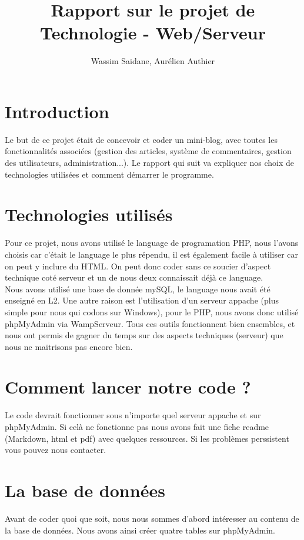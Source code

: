 \documentclass{article}
\title{Rapport sur le projet de Technologie - Web/Serveur}
\author{Wassim Saidane, Aurélien Authier}
\date{}
\begin{document}
    \maketitle
    \tableofcontents
    \newpage
    \section*{Introduction}
    Le but de ce projet était de concevoir et coder un mini-blog, avec toutes les fonctionnalités associées (gestion des articles, système de commentaires, gestion des utilisateurs, administration...). Le rapport qui suit va expliquer nos choix de technologies utilisées et comment démarrer le programme.   

    \section{Technologies utilisés}
    Pour ce projet, nous avons utilisé le language de programation PHP, 
    nous l'avons choisis car c'était le language le plus répendu,
    il est également facile à utiliser car on peut y inclure du HTML. On peut
    donc coder sans ce soucier d'aspect technique coté serveur et un de nous deux 
    connaissait déjà ce language. \\
    Nous avons utilisé une base de donnée mySQL, le language nous avait été enseigné en L2.
    Une autre raison est l'utilisation d'un serveur appache (plus simple pour nous qui codons sur Windows),
    pour le PHP, nous avons donc utilisé phpMyAdmin via WampServeur. Tous ces outils fonctionnent bien ensembles,
    et nous ont permis de gagner du temps sur des aspects techniques (serveur) que nous ne maitrisons pas encore bien.

    \section{Comment lancer notre code ?}
    Le code devrait fonctionner sous n'importe quel serveur appache et sur phpMyAdmin. Si celà ne fonctionne pas nous avons fait une fiche readme (Markdown, html et pdf) avec quelques ressources.
    Si les problèmes perssistent vous pouvez nous contacter.
    \section{La base de données}
    Avant de coder quoi que soit, nous nous sommes d'abord intéresser au contenu de la base de données.
    Nous avons ainsi créer quatre tables sur phpMyAdmin.
\end{document}
